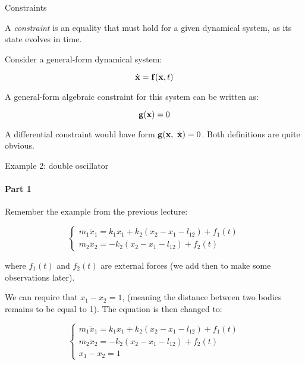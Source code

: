 \documentclass{beamer}
\begin{document}
\begin{frame}{Constraints}
\begin{flushleft}

A \emph{constraint} is an equality that must hold for a given dynamical system, as its state evolves in time.

\bigskip

Consider a general-form dynamical system:

\[
    \dot{\mathbf{x}} = \mathbf{f}(\mathbf{x}, t) 
\]

A general-form algebraic constraint for this system can be written as:

\begin{equation}
    \mathbf{g}(\mathbf{x}) = 0 
\end{equation}

\bigskip

A differential constraint would have form $\mathbf{g}(\mathbf{x}, \ \dot{\mathbf{x}}) = 0$. Both definitions are quite obvious.

\end{flushleft}
\end{frame}


\begin{frame}{Example 2: double oscillator}
\framesubtitle{Part 1}
\begin{flushleft}

Remember the example from the previous lecture:

\begin{equation}
\begin{cases}
    m_1 \ddot x_1 = k_1 x_1 + k_2 (x_2 - x_1 - l_{12}) + f_1 (t) \\
    m_2 \ddot x_2 = -k_2 (x_2 - x_1 - l_{12}) + f_2 (t)
\end{cases}
\end{equation}

where $f_1 (t)$ and $f_2 (t)$ are external forces (we add then to make some observations later).

\bigskip

We can require that $x_1 - x_2 = 1$, (meaning the distance between two bodies remains to be equal to 1). The equation is then changed to:

\begin{equation}
\begin{cases}
    m_1 \ddot x_1 = k_1 x_1 + k_2 (x_2 - x_1 - l_{12}) + f_1 (t) \\
    m_2 \ddot x_2 = -k_2 (x_2 - x_1 - l_{12}) + f_2 (t) \\
    x_1 - x_2 = 1
\end{cases}
\end{equation}

\end{flushleft}
\end{frame}
\end{document}
